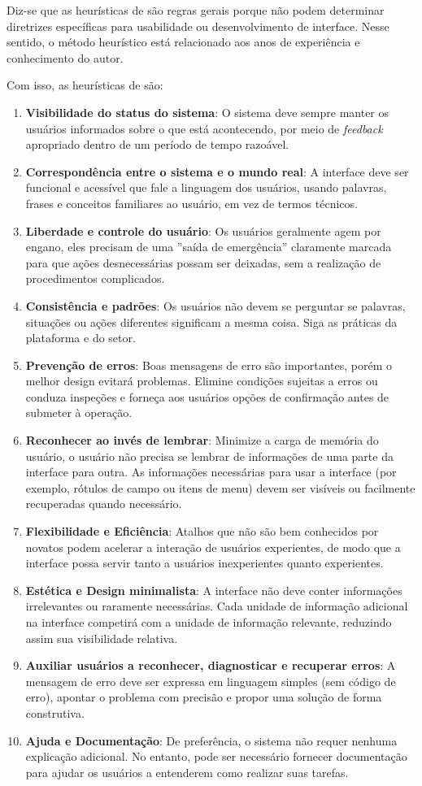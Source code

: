 Diz-se que as heurísticas de  são regras gerais porque não podem determinar diretrizes específicas para usabilidade ou desenvolvimento de interface. Nesse sentido, o método heurístico está relacionado aos anos de experiência e conhecimento do autor.

Com isso, as heurísticas de  são:
\begin{enumerate}
    \item \textbf{Visibilidade do status do sistema}: O sistema deve sempre manter os usuários informados sobre o que está acontecendo, por meio de \textit{feedback} apropriado dentro de um período de tempo razoável.
    \item \textbf{Correspondência entre o sistema e o mundo real}: A interface deve ser funcional e acessível que fale a linguagem dos usuários, usando palavras, frases e conceitos familiares ao usuário, em vez de termos técnicos.
    \item \textbf{Liberdade e controle do usuário}: Os usuários geralmente agem por engano, eles precisam de uma ''saída de emergência'' claramente marcada para que ações desnecessárias possam ser deixadas, sem a realização de procedimentos complicados.
    \item \textbf{Consistência e padrões}: Os usuários não devem se perguntar se palavras, situações ou ações diferentes significam a mesma coisa. Siga as práticas da plataforma e do setor. 
    \item \textbf{Prevenção de erros}: Boas mensagens de erro são importantes, porém o melhor design evitará problemas. Elimine condições sujeitas a erros ou conduza inspeções e forneça aos usuários opções de confirmação antes de submeter à operação.
    \item \textbf{Reconhecer ao invés de lembrar}: Minimize a carga de memória do usuário, o usuário não precisa se lembrar de informações de uma parte da interface para outra. As informações necessárias para usar a interface (por exemplo, rótulos de campo ou itens de menu) devem ser visíveis ou facilmente recuperadas quando necessário.
    \item \textbf{Flexibilidade e Eficiência}: Atalhos que não são bem conhecidos por novatos podem acelerar a interação de usuários experientes, de modo que a interface possa servir tanto a usuários inexperientes quanto experientes.
    \item \textbf{Estética e Design minimalista}: A interface não deve conter informações irrelevantes ou raramente necessárias. Cada unidade de informação adicional na interface competirá com a unidade de informação relevante, reduzindo assim sua visibilidade relativa.
    \item \textbf{Auxiliar usuários a reconhecer, diagnosticar e recuperar erros}: A mensagem de erro deve ser expressa em linguagem simples (sem código de erro), apontar o problema com precisão e propor uma solução de forma construtiva. 
    \item \textbf{Ajuda e Documentação}: De preferência, o sistema não requer nenhuma explicação adicional. No entanto, pode ser necessário fornecer documentação para ajudar os usuários a entenderem como realizar suas tarefas.
\end{enumerate}


